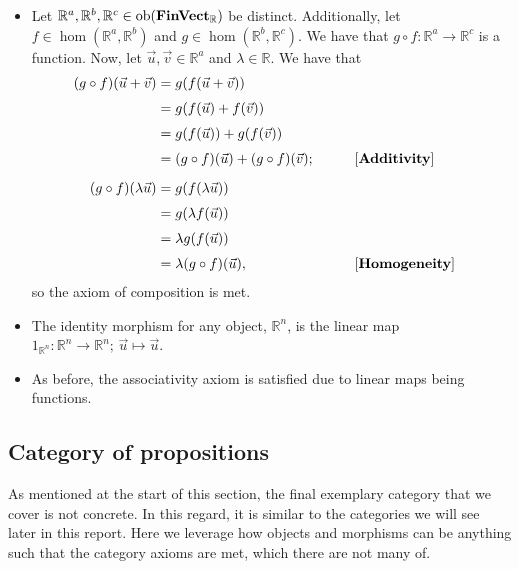 \documentclass[10pt,a4paper,reqno]{amsart}
\numberwithin{figure}{section}
\begin{document}
\begin{itemize}
        \item Let $\mathbb{R} ^a, \mathbb{R} ^b, \mathbb{R} ^c \in
                \operatorname{ob} ( \operatorname{\mathbf{FinVect}_\mathbb{R}} )$ be distinct. Additionally, let \\
                $f \in \hom ( \mathbb{R} ^a, \mathbb{R} ^b)$ and
                $g \in \hom ( \mathbb{R} ^b, \mathbb{R} ^c)$.
                We have that $g \circ f \colon \mathbb{R} ^a \to \mathbb{R} ^c$
                is a function. Now, let $\vec{u} , \vec{v} \in \mathbb{R} ^a$
                and $\lambda \in \mathbb{R}$. We have that
                \begin{alignat*}{8}
                        (g \circ f)( \vec{u} + \vec{v} )
                        &= g(f( \vec{u} + \vec{v} )) \\[0.3em]
                        &= g(f( \vec{u} ) + f( \vec{v} )) \\[0.3em]
                        &= g(f( \vec{u} )) + g(f( \vec{v} )) \\[0.3em]
                        &= (g \circ f)( \vec{u} ) + (g \circ f)( \vec{v} );
                        \qquad && \text{[\textbf{Additivity}]} \\[0.6em]
                        (g \circ f)( \lambda \vec{u} )
                        &= g(f( \lambda \vec{u} )) \\[0.3em]
                        &= g( \lambda f( \vec{u} )) \\[0.3em]
                        &= \lambda g(f( \vec{u} )) \\[0.3em]
                        &= \lambda (g \circ f)( \vec{u} ),
                        \qquad && \text{[\textbf{Homogeneity}]}
                \end{alignat*}
                so the axiom of composition is met.
        \item The identity morphism for any object, $\mathbb{R} ^n$, is the linear map
                $1_{ \mathbb{R} ^n } \colon \mathbb{R} ^n \to \mathbb{R} ^n ; \,
                \vec{u} \mapsto \vec{u}$.
        \item As before, the associativity axiom is satisfied due to linear maps
                being functions.
\end{itemize}

\subsection{Category of propositions}
As mentioned at the start of this section, the final exemplary category that we
cover is not concrete. In this regard, it is similar to the categories we will
see later in this report. Here we leverage how objects and morphisms can be
anything such that the category axioms are met, which there are not many of.
\end{document}
